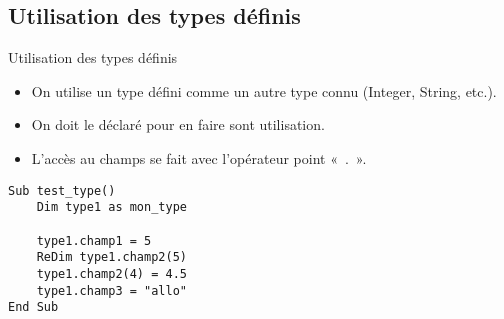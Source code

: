\documentclass[aspectratio=169,usenames,dvipsnames]{beamer}
\begin{document}
    \subsection{Utilisation des types définis}
    \begin{frame}[fragile]{Utilisation des types définis}
        \begin{itemize}
            \item On utilise un type défini comme un autre type connu (Integer, String, etc.).
            \item On doit le déclaré pour en faire sont utilisation.
            \item L’accès au champs se fait avec l’opérateur point « . ».
        \end{itemize}
\begin{lstlisting}
Sub test_type()
    Dim type1 as mon_type

    type1.champ1 = 5
    ReDim type1.champ2(5)
    type1.champ2(4) = 4.5
    type1.champ3 = "allo"
End Sub
\end{lstlisting}  
        
    \end{frame}
    
\end{document}
